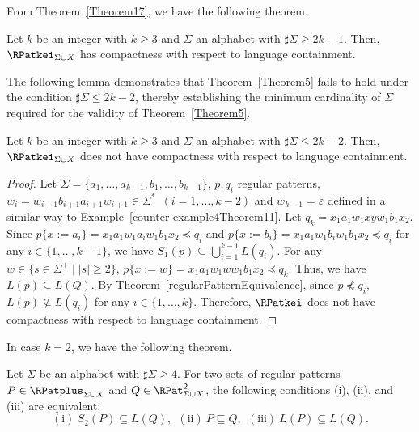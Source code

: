 {\color{black}From Theorem~\ref{Theorem17},
we have the following theorem.}

\begin{thm}\label{Theorem5}
    {\color{black}Let $k$ be an integer with $k \geq 3$ and $\Sigma$ an alphabet with $\sharp\Sigma \geq 2k-1$.}
    Then, {\color{black}$\RPatkei_{\Sigma\cup X}$} has compactness with respect to {\color{black} language} containment.
\end{thm}

{\color{black} 
The following lemma demonstrates that Theorem~\ref{Theorem5} fails to hold under the condition $\sharp\Sigma \leq 2k-2$, thereby establishing the minimum cardinality of $\Sigma$  required for the validity of Theorem~\ref{Theorem5}.
}
\begin{lem}\label{Sato1:Lemma19}
    {\color{black} Let $k$ be an integer with $k \geq 3$ and $\Sigma$ an alphabet with $\sharp\Sigma \leq 2k-2$.}
    Then, {\color{black}$\RPatkei_{\Sigma\cup X}$} does not have compactness with respect to {\color{black} language} containment.
\end{lem}

\begin{proof}
    Let $\Sigma =\{a_{1},\ldots,a_{k-1},b_{1},\ldots,b_{k-1}\}${\color{black},
    $p, q_{i}$ regular patterns, $w_{i}=w_{i+1}b_{i+1}a_{i+1}w_{i+1} \in \Sigma^{\ast}$\ $(i=1,\ldots,k-2)$ and $w_{k-1}=\varepsilon$}
    defined in a similar way to Example~\ref{counter-example4Theorem11}. 
    Let $q_{k}=x_{1}a_{1}w_{1}xyw_{1}b_{1}x_{2}$.
    Since
    $p\{x:=a_{i}\} = x_{1}a_{1}w_{1}a_{i}w_{1}b_{1}x_{2} \preceq q_{i}$ and
    $p\{x:=b_{i}\} = x_{1}a_{1}w_{1}b_{i}w_{1}b_{1}x_{2} \preceq q_{i}$
    for any $i \in \{1,\ldots,k-1\}$,
    we have $S_{1}(p) \subseteq \bigcup_{i=1}^{k-1}L(q_{i})$.
    For any $w \in \{s \in \Sigma^{+} \mid |s| \geq 2\}$,
    $p\{x:=w\}=x_{1}a_{1}w_{1}ww_{1}b_{1}x_{2} \preceq q_{k}$.
    Thus, we have $L(p) \subseteq L(Q)$.
    By Theorem~\ref{regularPatternEquivalence},
    since $p \not \preceq q_{i}$, $L(p) \not \subseteq L(q_{i})$
    for any $i \in \{1,\ldots, k\}$.
    Therefore, $\RPatkei$ does not have compactness with respect to {\color{black} language} containment.
\end{proof}

In case $k=2$, we have the following theorem.

\begin{thm}\label{Theorem21}
    {\color{black} Let $\Sigma$ be an alphabet with $\sharp\Sigma \geq 4$.
    For two sets of regular patterns $P \in \RPatplus_{\Sigma\cup X}$ and $Q \in \RPat^{2}_{\Sigma\cup X}$,
    the following conditions (i), (ii), and (iii) are equivalent:}
    \[
        \mathrm{(i)}\ S_{2}(P) \subseteq L(Q),\ \
        \mathrm{(ii)}\ P \sqsubseteq Q, \ \
        \mathrm{(iii)}\ L(P) \subseteq L(Q).
    \]
\end{thm}

